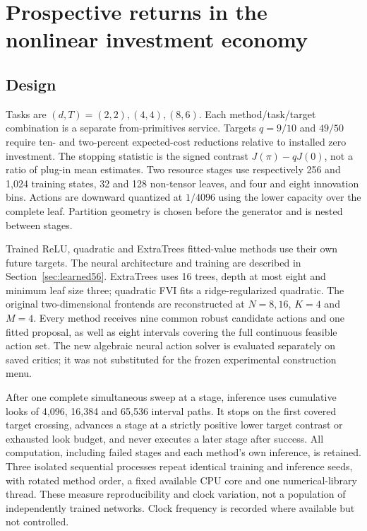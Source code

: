 \section{Prospective returns in the nonlinear investment economy}\label{sec:study56}
\subsection{Design}
Tasks are $(d,T)=(2,2),(4,4),(8,6)$. Each method/task/target combination is a separate from-primitives service. Targets $q=9/10$ and $49/50$ require ten- and two-percent expected-cost reductions relative to installed zero investment. The stopping statistic is the signed contrast $J(\pi)-qJ(0)$, not a ratio of plug-in mean estimates. Two resource stages use respectively 256 and 1,024 training states, 32 and 128 non-tensor leaves, and four and eight innovation bins. Actions are downward quantized at $1/4096$ using the lower capacity over the complete leaf. Partition geometry is chosen before the generator and is nested between stages.

Trained ReLU, quadratic and ExtraTrees fitted-value methods use their own future targets. The neural architecture and training are described in Section~\ref{sec:learned56}. ExtraTrees uses 16 trees, depth at most eight and minimum leaf size three; quadratic FVI fits a ridge-regularized quadratic. The original two-dimensional frontends are reconstructed at $N=8,16$, $K=4$ and $M=4$. Every method receives nine common robust candidate actions and one fitted proposal, as well as eight intervals covering the full continuous feasible action set. The new algebraic neural action solver is evaluated separately on saved critics; it was not substituted for the frozen experimental construction menu.

After one complete simultaneous sweep at a stage, inference uses cumulative looks of 4,096, 16,384 and 65,536 interval paths. It stops on the first covered target crossing, advances a stage at a strictly positive lower target contrast or exhausted look budget, and never executes a later stage after success. All computation, including failed stages and each method's own inference, is retained. Three isolated sequential processes repeat identical training and inference seeds, with rotated method order, a fixed available CPU core and one numerical-library thread. These measure reproducibility and clock variation, not a population of independently trained networks. Clock frequency is recorded where available but not controlled.

